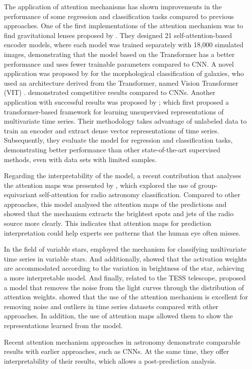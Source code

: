 The application of attention mechanisms has shown improvements in the performance of some regression and classification tasks compared to previous approaches. One of the first implementations of the attention mechanism was to find gravitational lenses proposed by \citet{thuruthipilly2021finding}. They designed 21 self-attention-based encoder models, where each model was trained separately with 18,000 simulated images, demonstrating that the model based on the Transformer has a better performance and uses fewer trainable parameters compared to CNN. A novel application was proposed by \citet{lin2021galaxy} for the morphological classification of galaxies, who used an architecture derived from the Transformer, named Vision Transformer (VIT) \citep{dosovitskiy2020image}. \citet{lin2021galaxy} demonstrated competitive results compared to CNNs. Another application with successful results was proposed by \citet{zerveas2021transformer}; which first proposed a transformer-based framework for learning unsupervised representations of multivariate time series. Their methodology takes advantage of unlabeled data to train an encoder and extract dense vector representations of time series. Subsequently, they evaluate the model for regression and classification tasks, demonstrating better performance than other state-of-the-art supervised methods, even with data sets with limited samples.

Regarding the interpretability of the model, a recent contribution that analyses the attention maps was presented by \citet{bowles20212}, which explored the use of group-equivariant self-attention for radio astronomy classification. Compared to other approaches, this model analysed the attention maps of the predictions and showed that the mechanism extracts the brightest spots and jets of the radio source more clearly. This indicates that attention maps for prediction interpretation could help experts see patterns that the human eye often misses. \par

In the field of variable stars, \citet{allam2021paying} employed the mechanism for classifying multivariate time series in variable stars. And additionally, \citet{allam2021paying} showed that the activation weights are accommodated according to the variation in brightness of the star, achieving a more interpretable model. And finally, related to the TESS telescope, \citet{morvan2022don} proposed a model that removes the noise from the light curves through the distribution of attention weights. \citet{morvan2022don} showed that the use of the attention mechanism is excellent for removing noise and outliers in time series datasets compared with other approaches. In addition, the use of attention maps allowed them to show the representations learned from the model. \par

Recent attention mechanism approaches in astronomy demonstrate comparable results with earlier approaches, such as CNNs. At the same time, they offer interpretability of their results, which allows a post-prediction analysis. \par

